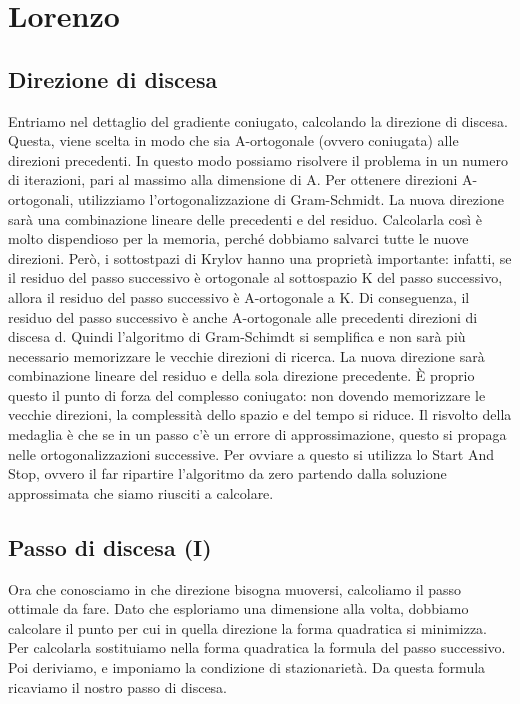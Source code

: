 \documentclass[a4paper]{article}
\begin{document}
\section*{Lorenzo}

\subsection*{Direzione di discesa}
Entriamo nel dettaglio del gradiente coniugato, calcolando la direzione di discesa.
Questa, viene scelta in modo che sia A-ortogonale (ovvero coniugata) alle direzioni precedenti. In questo modo possiamo risolvere il problema in un numero di iterazioni, pari al massimo alla dimensione di A.
Per ottenere direzioni A-ortogonali, utilizziamo l’ortogonalizzazione di Gram-Schmidt.
La nuova direzione sarà una combinazione lineare delle precedenti e del residuo.
Calcolarla così è molto dispendioso per la memoria, perché dobbiamo salvarci tutte le nuove direzioni.
Però, i sottostpazi di Krylov hanno una proprietà importante: infatti, se il residuo del passo successivo è ortogonale al sottospazio K del passo successivo, allora il residuo del passo successivo è A-ortogonale a K.
Di conseguenza, il residuo del passo successivo è anche A-ortogonale alle precedenti direzioni di discesa d.
Quindi l’algoritmo di Gram-Schimdt si semplifica e non sarà più necessario memorizzare le vecchie direzioni di ricerca.
La nuova direzione sarà combinazione lineare del residuo e della sola direzione precedente.
È proprio questo il punto di forza del complesso coniugato: non dovendo memorizzare le vecchie direzioni, la complessità dello spazio e del tempo si riduce.
Il risvolto della medaglia è che se in un passo c’è un errore di approssimazione, questo si propaga nelle ortogonalizzazioni successive. Per ovviare a questo si utilizza lo Start And Stop, ovvero il far ripartire l’algoritmo da zero partendo dalla soluzione approssimata che siamo riusciti a calcolare.

\subsection*{Passo di discesa (I)}
Ora che conosciamo in che direzione bisogna muoversi, calcoliamo il passo ottimale da fare. Dato che esploriamo una dimensione alla volta, dobbiamo calcolare il punto per cui in quella direzione la forma quadratica si minimizza.
Per calcolarla sostituiamo nella forma quadratica la formula del passo successivo.
Poi deriviamo, e imponiamo la condizione di stazionarietà.
Da questa formula ricaviamo il nostro passo di discesa.
\end{document}
